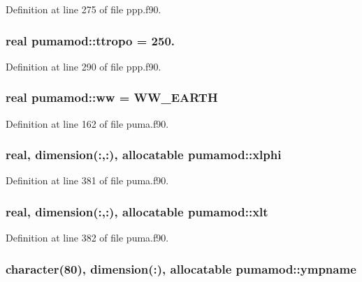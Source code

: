 \-Definition at line 275 of file ppp.\-f90.

\hypertarget{classpumamod_a5d1817a2b6703189d6ab73252b1996af}{
\subsubsection[{ttropo}]{\setlength{\rightskip}{0pt plus 5cm}real {\bf pumamod\-::ttropo} = 250.}}
\label{classpumamod_a5d1817a2b6703189d6ab73252b1996af}


\-Definition at line 290 of file ppp.\-f90.

\hypertarget{classpumamod_ac1247b3015d439d0c9f1b6b7ff94722b}{
\subsubsection[{ww}]{\setlength{\rightskip}{0pt plus 5cm}real {\bf pumamod\-::ww} = \-W\-W\-\_\-\-E\-A\-R\-T\-H}}
\label{classpumamod_ac1247b3015d439d0c9f1b6b7ff94722b}


\-Definition at line 162 of file puma.\-f90.

\hypertarget{classpumamod_a0d93d94e3ecf78ee4c82020b9e1ee95f}{
\subsubsection[{xlphi}]{\setlength{\rightskip}{0pt plus 5cm}real, dimension(\-:,\-:), allocatable {\bf pumamod\-::xlphi}}}
\label{classpumamod_a0d93d94e3ecf78ee4c82020b9e1ee95f}


\-Definition at line 381 of file puma.\-f90.

\hypertarget{classpumamod_a2f42df0a3ac789b2cb6e996a00f16fb4}{
\subsubsection[{xlt}]{\setlength{\rightskip}{0pt plus 5cm}real, dimension(\-:,\-:), allocatable {\bf pumamod\-::xlt}}}
\label{classpumamod_a2f42df0a3ac789b2cb6e996a00f16fb4}


\-Definition at line 382 of file puma.\-f90.

\hypertarget{classpumamod_a0961a19034b2c5becab0fe77c8e767b6}{
\subsubsection[{ympname}]{\setlength{\rightskip}{0pt plus 5cm}character(80), dimension(\-:), allocatable {\bf pumamod\-::ympname}}}
\label{classpumamod_a0961a19034b2c5becab0fe77c8e767b6}


